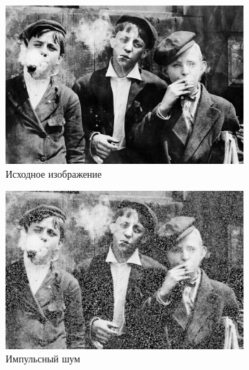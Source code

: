   \begin{figure}[ht!] 
    \centering
    \begin{subfigure}[b]{0.5\linewidth}
        \centering
        \includegraphics[width=0.95\linewidth]{../lewis-hine-taschen-main-3.jpg} 
        \caption{Исходное изображение} 
        \label{contraharmonic_0.5:a} 
        \vspace{4ex}
    \end{subfigure}%
    \begin{subfigure}[b]{0.5\linewidth}
      \centering
      \includegraphics[width=0.95\linewidth]{../Contraharmonic_Filter/Contraharmonic_Impulse_noise_(m,n=(3,_3),q=0.5).jpg} 
      \caption{Импульсный шум} 
      \label{contraharmonic_0.5:b} 
      \vspace{4ex}
    \end{subfigure}
    \begin{subfigure}[b]{0.5\linewidth}
      \centering

\end{subfigure}
\end{figure}
